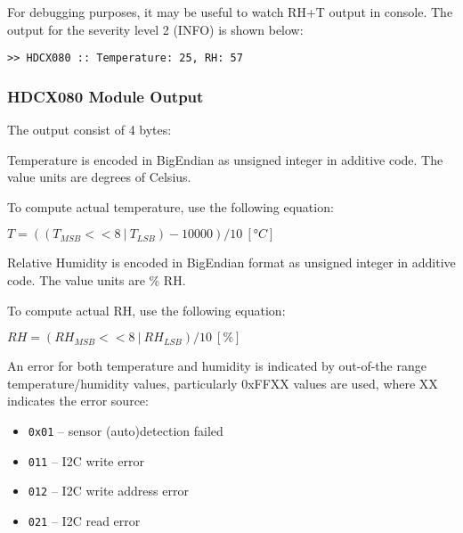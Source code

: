   For debugging purposes, it may be useful to watch RH+T output in console. The output for the severity level 2 (INFO) is shown below:

\begin{docCodeExample}
\begin{verbatim}
>> HDCX080 :: Temperature: 25, RH: 57
\end{verbatim}
\end{docCodeExample}

\subsubsection{HDCX080 Module Output}
  The  output consist of 4 bytes:
  

  Temperature is encoded in BigEndian as unsigned integer in additive code. The value units are degrees of Celsius.
  
  To compute actual temperature, use the following equation:
  
  $T = ((T_{MSB} << 8 ~|~ T_{LSB}) - 10000) / 10 ~[°C]$
  
  Relative Humidity is encoded in BigEndian format as unsigned integer in additive code. The value units are \% RH.
  
  To compute actual RH, use the following equation:
  
  $RH = (RH_{MSB} << 8 ~|~ RH_{LSB}) / 10 ~[\%]$
  
  An error for both temperature and humidity is indicated by out-of-the range temperature/humidity values, particularly 0xFFXX values are used, where XX indicates the error source:

\begin{itemize}
  \item {\tt 0x01} -- sensor (auto)detection failed
  \item {\tt 011} -- I2C write error
  \item {\tt 012} -- I2C write address error
  \item {\tt 021} -- I2C read error
\end{itemize}
  
